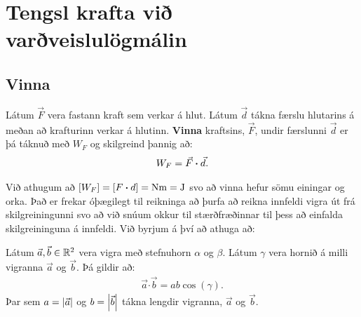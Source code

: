 \ifdefined \wholebook \else\documentclass[oneside]{book}\usepackage{EdlBook}\graphicspath{{figures/}}
\begin{document}
%
\setcounter{chapter}{6} %
%
\fi

\renewcommand{\thefigure}{\arabic{figure}}


\chapter{Tengsl krafta við varðveislulögmálin}

\section{Vinna}

\begin{tcolorbox}
\begin{definition}
Látum $\Vec{F}$ vera fastann kraft sem verkar á hlut. Látum $\Vec{d}$ tákna færslu hlutarins á meðan að krafturinn verkar á hlutinn. \textbf{Vinna} kraftsins, $\vec{F}$, undir færslunni $\Vec{d}$ er þá táknuð með $W_{F}$ og skilgreind þannig að:
\begin{align*}
    W_{F} = \vec{F} \vdot \vec{d}.
\end{align*}
\end{definition}
\end{tcolorbox}

Við athugum að $\left[W_F\right] = \left[ F \vdot d  \right] = \SI{}{Nm} = \SI{}{J}$ svo að vinna hefur sömu einingar og orka. Það er frekar óþægilegt til reikninga að þurfa að reikna innfeldi vigra út frá skilgreiningunni svo að við snúum okkur til stærðfræðinnar til þess að einfalda skilgreininguna á innfeldi. Við byrjum á því að athuga að:

\begin{tcolorbox}
\begin{setning}
Látum $\vec{a}, \vec{b} \in \mathbb{R}^2$ vera vigra með stefnuhorn $\alpha$ og $\beta$. Látum $\gamma$ vera hornið á milli vigranna $\vec{a}$ og $\vec{b}$. Þá gildir að:
\begin{align*}
    \vec{a} \bm{\cdot} \vec{b} = ab \cos(\gamma).
\end{align*}
Þar sem $a = \abs{\vec{a}}$ og $b = \abs{\vec{b}}$ tákna lengdir vigranna, $\vec{a}$ og $\vec{b}$.
\end{setning}
\end{tcolorbox}
\end{document}
